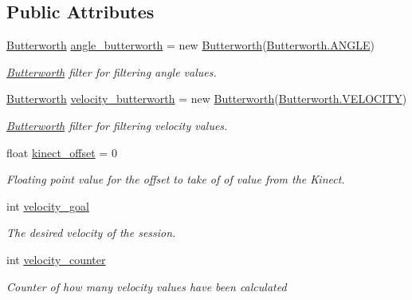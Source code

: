 \subsection*{Public Attributes}
\begin{DoxyCompactItemize}
\item 
\hyperlink{classkinect_expirement_1_1_butterworth}{Butterworth} \hyperlink{classkinect_expirement_1_1_kinect_form_abec90e6db4a70d6cccc38f90f800e3ab}{angle\+\_\+butterworth} = new \hyperlink{classkinect_expirement_1_1_butterworth}{Butterworth}(\hyperlink{classkinect_expirement_1_1_butterworth_ac991123445c654cb0da7d7841e313b2c}{Butterworth.\+A\+N\+G\+LE})
\begin{DoxyCompactList}\small\item\em \hyperlink{classkinect_expirement_1_1_butterworth}{Butterworth} filter for filtering angle values. \end{DoxyCompactList}\item 
\hyperlink{classkinect_expirement_1_1_butterworth}{Butterworth} \hyperlink{classkinect_expirement_1_1_kinect_form_a7f1502bd90febb3137d8e4fdf71d52ec}{velocity\+\_\+butterworth} = new \hyperlink{classkinect_expirement_1_1_butterworth}{Butterworth}(\hyperlink{classkinect_expirement_1_1_butterworth_afc717929ffc8d554b7e0263e2b06806a}{Butterworth.\+V\+E\+L\+O\+C\+I\+TY})
\begin{DoxyCompactList}\small\item\em \hyperlink{classkinect_expirement_1_1_butterworth}{Butterworth} filter for filtering velocity values. \end{DoxyCompactList}\item 
float \hyperlink{classkinect_expirement_1_1_kinect_form_a97a0dd9256e1093328fafccaca672398}{kinect\+\_\+offset} = 0
\begin{DoxyCompactList}\small\item\em Floating point value for the offset to take of of value from the Kinect. \end{DoxyCompactList}\item 
int \hyperlink{classkinect_expirement_1_1_kinect_form_a6334825924ef2914544c0c96c0ad0572}{velocity\+\_\+goal}
\begin{DoxyCompactList}\small\item\em The desired velocity of the session. \end{DoxyCompactList}\item 
int \hyperlink{classkinect_expirement_1_1_kinect_form_aedd93118198e798ee966ff768038bac1}{velocity\+\_\+counter}
\begin{DoxyCompactList}\small\item\em Counter of how many velocity values have been calculated \end{DoxyCompactList}\end{DoxyCompactItemize}
